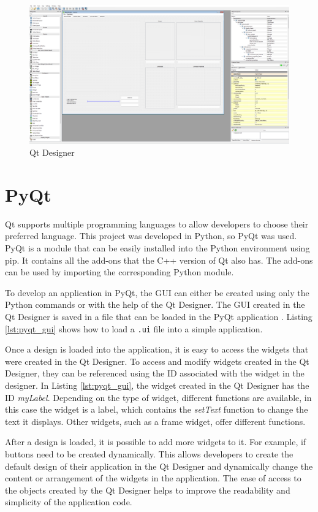 \begin{figure}
    \centering
    \includegraphics[width=0.8\linewidth]{images/qt_designer.png}
    \caption{Qt Designer}
    \label{fig:qt_designer}
\end{figure}

\section{PyQt}
\label{sub:pyqt}


Qt supports multiple programming languages to allow developers to choose their preferred language. This project was developed in Python, so PyQt was used. PyQt is a module that can be easily installed into the Python environment using pip. It contains all the add-ons that the C++ version of Qt also has. The add-ons can be used by importing the corresponding Python module. 

To develop an application in PyQt, the GUI can either be created using only the Python commands or with the help of the Qt Designer. The GUI created in the Qt Designer is saved in a  file that can be loaded in the PyQt application \cite{pyqt}. Listing \ref{lst:pyqt_gui} shows how to load a \texttt{.ui} file into a simple application. 

Once a design is loaded into the application, it is easy to access the widgets that were created in the Qt Designer. To access and modify widgets created in the Qt Designer, they can be referenced using the ID associated with the widget in the designer. In Listing \ref{lst:pyqt_gui}, the widget created in the Qt Designer has the ID \textit{myLabel}. Depending on the type of widget, different functions are available, in this case the widget is a label, which contains the \textit{setText} function to change the text it displays. Other widgets, such as a frame widget, offer different functions. 

After a design is loaded, it is possible to add more widgets to it. For example, if buttons need to be created dynamically. This allows developers to create the default design of their application in the Qt Designer and dynamically change the content or arrangement of the widgets in the application. The ease of access to the objects created by the Qt Designer helps to improve the readability and simplicity of the application code.

